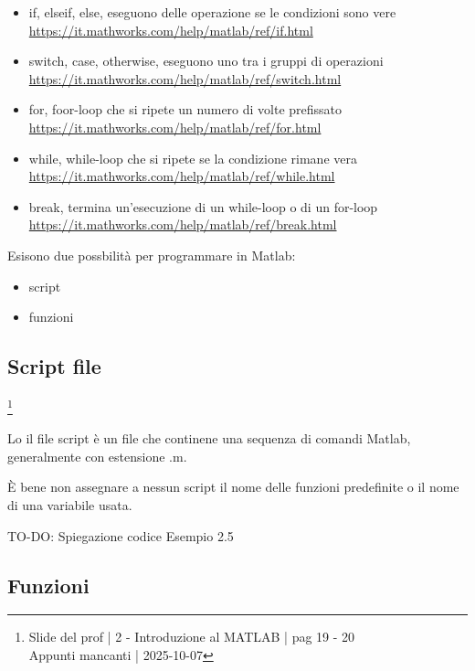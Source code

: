 \begin{itemize}
    \item if, elseif, else, eseguono  delle operazione se le condizioni sono vere \url{https://it.mathworks.com/help/matlab/ref/if.html} 
    \item switch, case, otherwise, eseguono uno tra i gruppi di operazioni \url{https://it.mathworks.com/help/matlab/ref/switch.html} 
    \item for, foor-loop che si ripete un numero di volte prefissato \url{https://it.mathworks.com/help/matlab/ref/for.html} 
    \item while, while-loop che si ripete se la condizione rimane vera \url{https://it.mathworks.com/help/matlab/ref/while.html} 
    \item break, termina un'esecuzione di un while-loop o di un for-loop \url{https://it.mathworks.com/help/matlab/ref/break.html}
\end{itemize}

Esisono due possbilità per programmare in Matlab: 

\begin{itemize}
    \item script 
    \item funzioni 
\end{itemize} 

\newpage 

\subsection{Script file}

\footnote{ 
    Slide del prof | 2 - Introduzione al MATLAB | pag 19 - 20\\
    Appunti mancanti | 2025-10-07 
}

Lo il file script è un file che continene una sequenza di comandi Matlab, generalmente con estensione .m. \newline 

È bene non assegnare a nessun script il nome delle funzioni predefinite o il nome di una variabile usata. \newline 

\begin{tcolorbox}[colback=green!5!white,colframe=green!75!black]
TO-DO: Spiegazione codice Esempio 2.5
\end{tcolorbox} 

\newpage 

\subsection{Funzioni}

